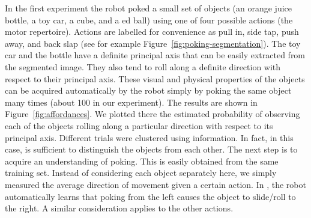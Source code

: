 In the first experiment the robot poked a small set of objects 
(an orange juice bottle, a toy car, a cube, and a \ahhcolor{}ed ball) using 
one of four possible actions (the motor repertoire). Actions are 
labelled for convenience as pull in, side tap, push away, and back 
slap (see for example Figure~\ref{fig:poking-segmentation}). 
The toy car and the bottle have a definite principal axis that 
can be easily extracted from the segmented image. They also tend to 
roll along a definite direction with respect to their principal axis. 
These visual and physical properties of the objects can be acquired 
automatically by the robot simply by poking the same object many times 
(about 100 in our experiment). The results are shown in 
Figure~\ref{fig:affordances}. We plotted there the estimated probability 
of observing each of the objects rolling along a particular direction 
with respect to its principal axis. Different trials were clustered 
using \ahhcolor{} information. In fact, in this case, \ahhcolor{} is sufficient
to distinguish the objects from each other. The next step is to
acquire an understanding of poking. This is easily obtained from 
the same training set. Instead of considering each object separately 
here, we simply measured the average direction of movement given a 
certain action. In \ahhpractice{}, the robot automatically learns that 
poking from the left causes the object to slide/roll to the right. 
A similar consideration applies to the other actions.

